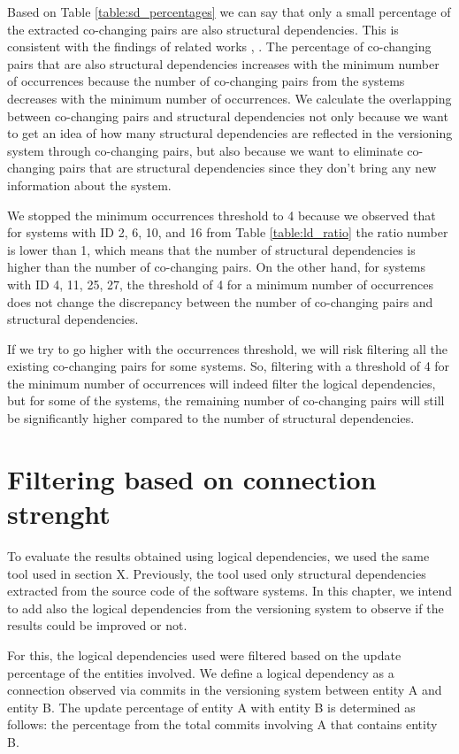 \documentclass[12pt]{mitthesis}
\begin{document}
Based on Table \ref{table:sd_percentages} we can say that only a small percentage of the extracted co-changing pairs are also structural dependencies. This is consistent with the findings of related works \cite{DBLP:journals/jss/AjienkaC17}, \cite{DBLP:journals/ese/AjienkaCC18}. 
The percentage of co-changing pairs that are also structural dependencies increases with the minimum number of occurrences because the number of co-changing pairs from the systems decreases with the minimum number of occurrences. 
We calculate the overlapping between co-changing pairs and structural dependencies not only because we want to get an idea of how many structural dependencies are reflected in the versioning system through co-changing pairs, but also because we want to eliminate co-changing pairs that are structural dependencies since they don't bring any new information about the system.

We stopped the minimum occurrences threshold to 4 because we observed that for systems with ID 2, 6, 10, and 16 from Table \ref{table:ld_ratio} the ratio number is lower than 1, which means that the number of structural dependencies is higher than the number of co-changing pairs. On the other hand, for systems with ID 4, 11, 25, 27, the threshold of 4 for a minimum number of occurrences does not change the discrepancy between the number of co-changing pairs and structural dependencies.

If we try to go higher with the occurrences threshold, we will risk filtering all the existing co-changing pairs for some systems.
So, filtering with a threshold of 4 for the minimum number of occurrences will indeed filter the logical dependencies, but for some of the systems, the remaining number of co-changing pairs will still be significantly higher compared to the number of structural dependencies.


\section{Filtering based on connection strenght}
\label{sec:filterstrength}

To evaluate the results obtained using logical dependencies, we used the same tool used in section X. 
Previously, the tool used only structural dependencies extracted from the source code of the software systems. In this chapter, we intend to add also the logical dependencies from the versioning system to observe if the results could be improved or not.

For this, the logical dependencies used were filtered based on the update percentage of the entities involved. We define a logical dependency as a connection observed via commits in the versioning system between entity A and entity B. The update percentage of entity A with entity B is determined as follows: the percentage from the total commits involving A that contains entity B.
\end{document}
